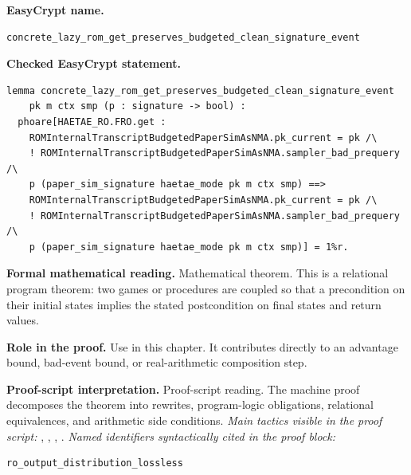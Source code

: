 \begin{formaltheorem}
\noindent\textbf{EasyCrypt name.}
\begin{lstlisting}[language=EasyCrypt,basicstyle=\ttfamily\scriptsize]
concrete_lazy_rom_get_preserves_budgeted_clean_signature_event
\end{lstlisting}
\noindent\textbf{Checked EasyCrypt statement.}
\begin{lstlisting}[language=EasyCrypt,basicstyle=\ttfamily\scriptsize]
lemma concrete_lazy_rom_get_preserves_budgeted_clean_signature_event
    pk m ctx smp (p : signature -> bool) :
  phoare[HAETAE_RO.FRO.get :
    ROMInternalTranscriptBudgetedPaperSimAsNMA.pk_current = pk /\
    ! ROMInternalTranscriptBudgetedPaperSimAsNMA.sampler_bad_prequery /\
    p (paper_sim_signature haetae_mode pk m ctx smp) ==>
    ROMInternalTranscriptBudgetedPaperSimAsNMA.pk_current = pk /\
    ! ROMInternalTranscriptBudgetedPaperSimAsNMA.sampler_bad_prequery /\
    p (paper_sim_signature haetae_mode pk m ctx smp)] = 1%r.
\end{lstlisting}
\noindent\textbf{Formal mathematical reading.}
Mathematical theorem. This is a relational program theorem: two games or procedures are coupled so that a precondition on their initial states implies the stated postcondition on final states and return values.

\noindent\textbf{Role in the proof.}
Use in this chapter. It contributes directly to an advantage bound, bad-event bound, or real-arithmetic composition step.

\noindent\textbf{Proof-script interpretation.}
Proof-script reading. The machine proof decomposes the theorem into rewrites, program-logic obligations, relational equivalences, and arithmetic side conditions.
\emph{Main tactics visible in the proof script:} \ec{proc}, \ec{wp}, \ec{rnd}, \ec{smt}.
\emph{Named identifiers syntactically cited in the proof block:}
\begin{lstlisting}[language=EasyCrypt,basicstyle=\ttfamily\scriptsize]
ro_output_distribution_lossless
\end{lstlisting}

\end{formaltheorem}

